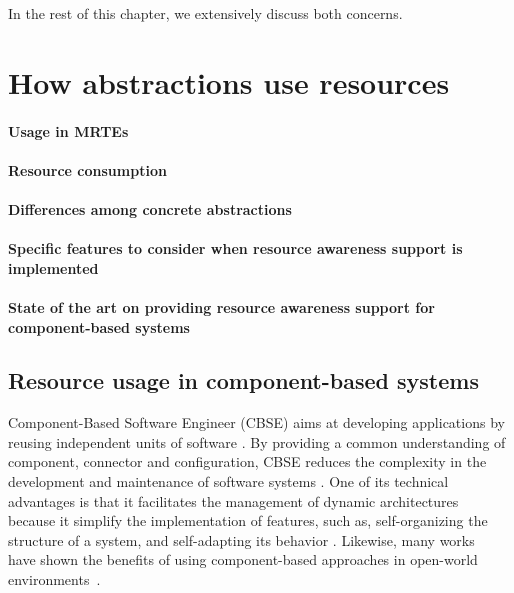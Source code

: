 In the rest of this chapter, we extensively discuss both concerns.

\section{How abstractions use resources}


\paragraph{Usage in MRTEs}

\paragraph{Resource consumption}

\paragraph{Differences among concrete abstractions}

\paragraph{Specific features to consider when resource awareness support is implemented}

\paragraph{State of the art on providing resource awareness support for component-based systems}

\subsection{Resource usage in component-based systems} \label{sec:components-oriented-resource-awareness}

Component-Based Software Engineer (CBSE) aims at developing applications by reusing independent units of software \cite{cbse-conference, Crnkovic2011}.
By providing a common understanding of component, connector and configuration, CBSE reduces the complexity in the development and maintenance of software systems \cite{xadl,Medvidovic:2000,VanOmmering-et-al-00}.
One of its technical advantages is that it facilitates the management of dynamic architectures
~\cite{DBLP:journals/ase/NittoGMPP08, Johnson:2015:CSM:2735960.2735979}
because it simplify the implementation of features, such as, self-organizing the structure of a system, and self-adapting its behavior
\cite{PanzicaLaManna:2012:LDU:2304736.2304764, Johnson:2015:CSM:2735960.2735979,Zhang:2009:MVD:1509239.1509262}.
Likewise, many works~\cite{cbse-conference} have shown the benefits of using component-based approaches in open-world environments~\cite{baresi2006toward, Caporuscio:2010:AIA:1985522.1985547, Perez-Palacin:2010:PAO:1712605.1712614}.

